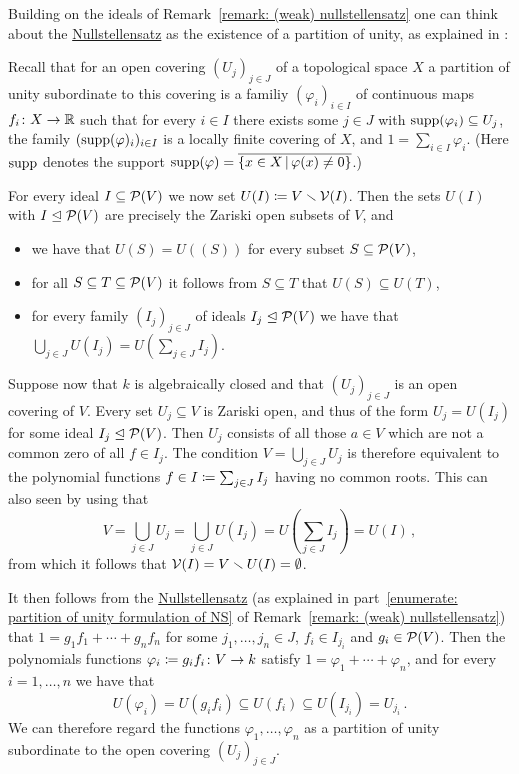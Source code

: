 \begin{remark}
  Building on the ideals of Remark~\ref{remark: (weak) nullstellensatz} one can think about the \hyperref[theorem: nullstellensatz]{Nullstellensatz} as the existence of a partition of unity, as explained in \cite{SBS}:
  
  Recall that for an open covering $(U_j)_{j \in J}$ of a topological space $X$ a partition of unity subordinate to this covering is a familiy $(\varphi_i)_{i \in I}$ of continuous maps $f_i \colon X \to \mathbb{R}$ such that for every $i \in I$ there exists some $j \in J$ with $\operatorname{supp}(\varphi_i) \subseteq U_j$, the family $(\operatorname{supp}(\varphi)_i)_{i \in I}$ is a locally finite covering of $X$, and $1 = \sum_{i \in I} \varphi_i$.
  (Here $\operatorname{supp}$ denotes the support $\supp(\varphi) = \closure{\{x \in X \suchthat \varphi(x) \neq 0\}}$.)
  
  For every ideal $I \subseteq \mathcal{P}(V)$ we now set $U(I) \coloneqq V \smallsetminus \mathcal{V}(I)$.
  Then the sets $U(I)$ with $I \trianglelefteq \mathcal{P}(V)$ are precisely the Zariski open subsets of $V$, and
  \begin{itemize}
    \item
      we have that $U(S) = U((S))$ for every subset $S \subseteq \mathcal{P}(V)$,
    \item
      for all $S \subseteq T \subseteq \mathcal{P}(V)$ it follows from $S \subseteq T$ that $U(S) \subseteq U(T)$,
    \item
      for every family $(I_j)_{j \in J}$ of ideals $I_j \trianglelefteq \mathcal{P}(V)$ we have that $\bigcup_{j \in J} U(I_j) = U( \sum_{j \in J} I_j )$.
  \end{itemize}
  
  Suppose now that $k$ is algebraically closed and that $(U_j)_{j \in J}$ is an open covering of $V$.
  Every set $U_j \subseteq V$ is Zariski open, and thus of the form $U_j = U(I_j)$ for some ideal $I_j \trianglelefteq \mathcal{P}(V)$.
  Then $U_j$ consists of all those $a \in V$ which are not a common zero of all $f \in I_j$.
  The condition $V = \bigcup_{j \in J} U_j$ is therefore equivalent to the polynomial functions $f \in I \coloneqq \sum_{j \in J} I_j$ having no common roots.
  This can also seen by using that
  \[
      V
    = \bigcup_{j \in J} U_j
    = \bigcup_{j \in J} U(I_j)
    = U\left( \sum_{j \in J} I_j \right)
    = U(I) \,,
  \]
  from which it follows that $\mathcal{V}(I) = V \smallsetminus U(I) = \emptyset$.
  
  It then follows from the \hyperref[theorem: nullstellensatz]{Nullstellensatz} (as explained in part~\ref*{enumerate: partition of unity formulation of NS} of Remark~\ref{remark: (weak) nullstellensatz}) that $1 = g_1 f_1 + \dotsb + g_n f_n$ for some $j_1, \dotsc, j_n \in J$, $f_i \in I_{j_i}$ and $g_i \in \mathcal{P}(V)$.
  Then the polynomials functions $\varphi_i \coloneqq g_i f_i \colon V \to k$ satisfy $1 = \varphi_1 + \dotsb + \varphi_n$, and for every $i = 1, \dotsc, n$ we have that
  \[
              U(\varphi_i)
    =         U(g_i f_i)
    \subseteq U(f_i)
    \subseteq U(I_{j_i})
    =         U_{j_i} \,.
  \]
  We can therefore regard the functions $\varphi_1, \dotsc, \varphi_n$ as a partition of unity subordinate to the open covering $(U_j)_{j \in J}$.
\end{remark}


